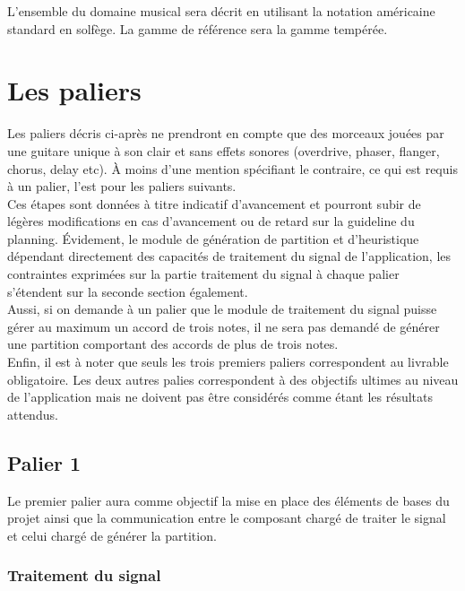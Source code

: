\documentclass[12pt]{article}
\begin{document}
L’ensemble du domaine musical sera décrit en utilisant la notation américaine standard en solfège. La gamme de référence sera la gamme tempérée. \\

\newpage
\section{Les paliers}

Les paliers décris ci-après ne prendront en compte que des morceaux jouées par une guitare unique à son clair et sans effets sonores (overdrive, phaser, flanger, chorus, delay etc). À moins d’une mention spécifiant le contraire, ce qui est requis à un palier, l’est pour les paliers suivants.\\

Ces étapes sont données à titre indicatif d’avancement et pourront subir de légères modifications en cas d’avancement ou de retard sur la guideline du planning. Évidement, le module de génération de partition et d’heuristique dépendant directement des capacités de traitement du signal de l’application, les contraintes exprimées sur la partie traitement du signal à chaque palier s’étendent sur la seconde section également.\\

Aussi, si on demande à un palier que le module de traitement du signal puisse gérer au maximum un accord de trois notes, il ne sera pas demandé de générer une partition comportant des accords de plus de trois notes.\\

Enfin, il est à noter que seuls les trois premiers paliers correspondent au livrable obligatoire. Les deux autres palies correspondent à des objectifs ultimes au niveau de l'application mais ne doivent pas être considérés comme étant les résultats attendus.

\newpage
\subsection{Palier 1}

Le premier palier aura comme objectif la mise en place des éléments de bases du projet ainsi que la communication entre le composant chargé de traiter le signal et celui chargé de générer la partition.\\

\subsubsection{Traitement du signal}
\end{document}
